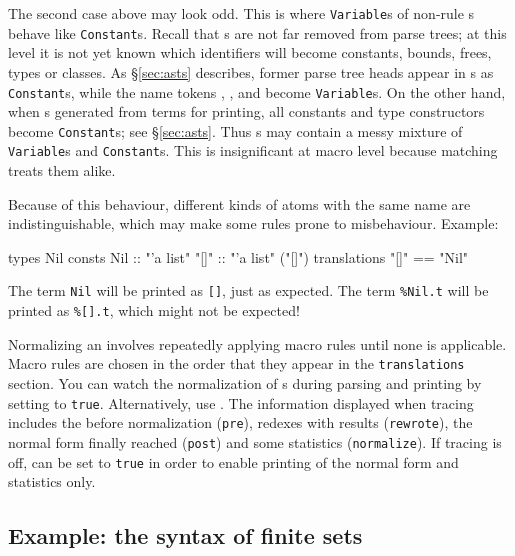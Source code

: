 The second case above may look odd.  This is where {\tt Variable}s of
non-rule \AST{}s behave like {\tt Constant}s.  Recall that \AST{}s are not
far removed from parse trees; at this level it is not yet known which
identifiers will become constants, bounds, frees, types or classes.  As
\S\ref{sec:asts} describes, former parse tree heads appear in \AST{}s as
{\tt Constant}s, while the name tokens , ,  and
 become {\tt Variable}s.  On the other hand, when \AST{}s
generated from terms for printing, all constants and type constructors
become {\tt Constant}s; see \S\ref{sec:asts}.  Thus \AST{}s may contain a
messy mixture of {\tt Variable}s and {\tt Constant}s.  This is
insignificant at macro level because matching treats them alike.

Because of this behaviour, different kinds of atoms with the same name are
indistinguishable, which may make some rules prone to misbehaviour.  Example:
\begin{ttbox}
types
  Nil
consts
  Nil     :: "'a list"
  "[]"    :: "'a list"    ("[]")
translations
  "[]"    == "Nil"
\end{ttbox}
The term {\tt Nil} will be printed as {\tt []}, just as expected.
The term \verb|%Nil.t| will be printed as \verb|%[].t|, which might not be
expected! 

Normalizing an \AST{} involves repeatedly applying macro rules until none
is applicable.  Macro rules are chosen in the order that they appear in the
{\tt translations} section.  You can watch the normalization of \AST{}s
during parsing and printing by setting  to
{\tt true}. Alternatively, use
.  The information displayed when tracing
includes the \AST{} before normalization ({\tt pre}), redexes with results
({\tt rewrote}), the normal form finally reached ({\tt post}) and some
statistics ({\tt normalize}).  If tracing is off,
 can be set to {\tt true} in order to enable
printing of the normal form and statistics only.


\subsection{Example: the syntax of finite sets}

